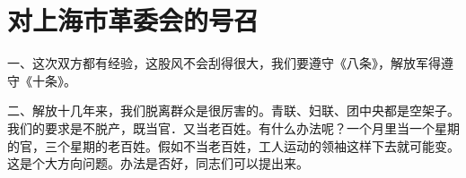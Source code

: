 \section[对上海市革委会的号召（一九六七年五月）]{对上海市革委会的号召}


一、这次双方都有经验，这股风不会刮得很大，我们要遵守《八条》，解放军得遵守《十条》。

二、解放十几年来，我们脱离群众是很厉害的。青联、妇联、团中央都是空架子。我们的要求是不脱产，既当官．又当老百姓。有什么办法呢？一个月里当一个星期的官，三个星期的老百姓。假如不当老百姓，工人运动的领袖这样下去就可能变。这是个大方向问题。办法是否好，同志们可以提出来。

